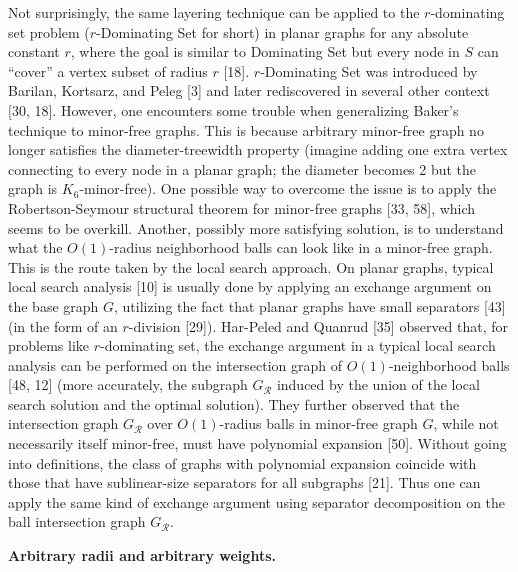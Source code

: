 Not surprisingly, the same layering technique can be applied to the $r$-dominating set problem ($r$-Dominating Set for short) in planar graphs for any absolute constant $r$, where the goal is similar to Dominating Set but every node in $S$ can “cover” a vertex subset of radius $r$ [18]. $r$-Dominating Set was introduced by Barilan, Kortsarz, and Peleg [3] and later rediscovered in several other context [30, 18]. However, one encounters some trouble when generalizing Baker’s technique to minor-free graphs. This is because arbitrary minor-free graph no longer satisfies the diameter-treewidth property (imagine adding one extra vertex connecting to every node in a planar graph; the diameter becomes 2 but the graph is $K_{6}$-minor-free). One possible way to overcome the issue is to apply the Robertson-Seymour structural theorem for minor-free graphs [33, 58], which seems to be overkill. Another, possibly more satisfying solution, is to understand what the $O(1)$-radius neighborhood balls can look like in a minor-free graph. This is the route taken by the local search approach. On planar graphs, typical local search analysis [10] is usually done by applying an exchange argument on the base graph $G$, utilizing the fact that planar graphs have small separators [43] (in the form of an $r$-division [29]). Har-Peled and Quanrud [35] observed that, for problems like $r$-dominating set, the exchange argument in a typical local search analysis can be performed on the intersection graph of $O(1)$-neighborhood balls [48, 12] (more accurately, the subgraph $G_{\mathcal{R}}$ induced by the union of the local search solution and the optimal solution). They further observed that the intersection graph $G_{\mathcal{R}}$ over $O(1)$-radius balls in minor-free graph $G$, while not necessarily itself minor-free, must have polynomial expansion [50]. Without going into definitions, the class of graphs with polynomial expansion coincide with those that have sublinear-size separators for all subgraphs [21]. Thus one can apply the same kind of exchange argument using separator decomposition on the ball intersection graph $G_{\mathcal{R}}$.
\par
\par
\par\medskip\noindent\textbf{Arbitrary radii and arbitrary weights.}\par
